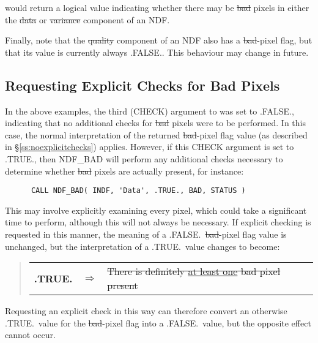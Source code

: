 would return a logical value indicating whether there may be \st{bad\/}
pixels in either the \st{data\/} or \st{variance\/} component of an NDF. 

Finally, note that the \st{quality\/} component of an NDF also has a
\st{bad\/}-pixel flag, but that its value is currently always .FALSE..
This behaviour may change in future.

\subsection{\label{ss:badpixelabort}\label{ss:explicitchecks}Requesting Explicit Checks for Bad Pixels}

In the above examples, the third (CHECK) argument to  was set to
.FALSE., indicating that no additional checks for \st{bad\/} pixels were to
be performed. 
In this case, the normal interpretation of the returned \st{bad\/}-pixel flag
value (as described in \S\ref{ss:noexplicitchecks}) applies. 
However, if this CHECK argument is set to .TRUE., then NDF\_BAD will perform
any additional checks necessary to determine whether \st{bad\/} pixels are
actually present, for instance:

\small
\begin{verbatim}
      CALL NDF_BAD( INDF, 'Data', .TRUE., BAD, STATUS )
\end{verbatim}
\normalsize

This may involve explicitly examining every pixel, which could take a
significant time to perform, although this will not always be necessary. 
If explicit checking is requested in this manner, the meaning of a
.FALSE.\ \st{bad\/}-pixel flag value is unchanged, but the
interpretation of a .TRUE.\ value changes to become: 

\small
\begin{quote}
\begin{center}
\begin{tabular}{rcl}
{\bf .TRUE.} & $\Rightarrow$ & \st{There is definitely \underline{at least one}
bad pixel present} 
\end{tabular}
\end{center}
\end{quote}
\normalsize

Requesting an explicit check in this way can therefore convert an otherwise
.TRUE.\ value for the \st{bad\/}-pixel flag into a .FALSE.\ value, but the
opposite effect cannot occur. 

